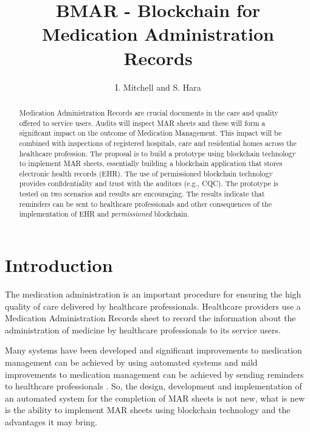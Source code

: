 \documentclass[runningheads]{llncs}
\begin{document}
\title{BMAR - Blockchain for Medication Administration Records}
\author{I. Mitchell and S. Hara}
\maketitle


\begin{abstract}
	Medication Administration Records are crucial documents in the care and quality offered to service users. Audits will inspect MAR sheets and these will form a significant impact on the outcome of Medication Management. This impact will be combined with inspections of registered hospitals, care and residential homes across the healthcare profession. The proposal is to build a prototype using blockchain technology to implement MAR sheets, essentially building a blockchain application that stores electronic health records (EHR). The use of permissioned blockchain technology provides confidentiality and trust with the auditors (e.g., CQC). The prototype is tested on two scenarios and results are encouraging. The results indicate that reminders can be sent to healthcare professionals and other consequences of the implementation of EHR and {\em permissioned} blockchain.
\end{abstract} 



\section{Introduction}
The medication administration is an important procedure for ensuring the high quality of care delivered by healthcare professionals. Healthcare providers use a Medication Administration Records sheet to record the information about the administration of medicine by healthcare professionals to its service users. 

Many systems have been developed and significant improvements to medication management can be achieved by using automated systems \cite{bates1998effect} and mild improvements to medication management can be achieved by sending reminders to healthcare professionals \cite{bennett2003computerised}. So, the design, development and implementation of an automated system for the completion of MAR sheets is not new, what is new is the ability to implement MAR sheets using blockchain  technology and the advantages it may bring. 
\end{document}
